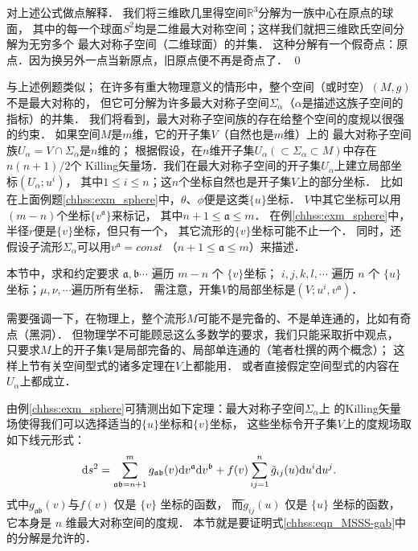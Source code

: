 对上述公式做点解释．
我们将三维欧几里得空间$\mathbb{R}^3$分解为一族中心在原点的球面，
其中的每一个球面$S^2$均是二维最大对称空间；这样我们就把三维欧氏空间分解为无穷多个
最大对称子空间（二维球面）的并集．
这种分解有一个假奇点：原点．因为换另外一点当新原点，旧原点便不再是奇点了．
\qed

与上述例题类似；
在许多有重大物理意义的情形中，整个空间（或时空）$(M,g)$不是最大对称的，
但它可分解为许多最大对称子空间$\Sigma_\alpha$（$\alpha$是描述这族子空间的指标）的并集．
我们将看到，最大对称子空间族的存在给整个空间的度规以很强的约束．
如果空间$M$是$m$维，它的开子集$V$（自然也是$m$维）上的
最大对称子空间族$U_\alpha=V\cap \Sigma_\alpha$是$n$维的；
根据假设，在$n$维开子集$U_\alpha (\subset \Sigma_\alpha \subset M)$中存在$n(n+1)/2$个
Killing矢量场．我们在最大对称子空间的开子集$U_\alpha$上建立局部坐标$(U_\alpha;u^i)$，
其中$1 \leqslant i \leqslant n $；这$n$个坐标自然也是开子集$V$上的部分坐标．
比如在上面例题\ref{chhss:exm_sphere}中，$\theta$、$\phi$便是这类$\{u\}$坐标．
$V$中其它坐标可以用$(m-n)$个坐标$\{v^{\mathfrak{a}}\}$来标记，
其中$n+1 \leqslant \mathfrak{a} \leqslant m$．
在例\ref{chhss:exm_sphere}中，半径$r$便是$\{v\}$坐标，但只有一个，
其它流形的$\{v\}$坐标可能不止一个．
同时，还假设子流形$\Sigma_\alpha$可以用$v^{\mathfrak{a}}=const$
（$n+1 \leqslant \mathfrak{a} \leqslant m$）来描述．

本节中，求和约定要求 $\mathfrak{a},\mathfrak{b} \cdots$ 遍历 $m-n$ 个 $\{v\}$坐标；
$i, j, k, l, \cdots$ 遍历 $n$ 个 $\{u\}$ 坐标；$\mu,\nu,\cdots$遍历所有坐标．
需注意，开集$V$的局部坐标是$(V;u^i, v^{\mathfrak{a}})$．

需要强调一下，在物理上，整个流形$M$可能不是完备的、不是单连通的，比如有奇点（黑洞）．
但物理学不可能顾忌这么多数学的要求，我们只能采取折中观点，
只要求$M$上的开子集$V$是局部完备的、局部单连通的（笔者杜撰的两个概念）；
这样上节有关空间型式的诸多定理在$V$上都能用．
或者直接假定空间型式的内容在$U_\alpha$上都成立．


由例\ref{chhss:exm_sphere}可猜测出如下{\heiti 定理}：最大对称子空间$\Sigma_\alpha$上
的Killing矢量场使得我们可以选择适当的$\{u\}$坐标和$\{v\}$坐标，
这些坐标令开子集$V$上的度规场取如下线元形式：
\begin{equation}\label{chhss:eqn_MSSS-gab}
    \mathrm{d} s^2= \sum_{\mathfrak{ab}=n+1}^{m}
    g_{\mathfrak{ab}}(v) \mathrm{d} v^{\mathfrak{a}} \mathrm{d} v^{\mathfrak{b}}
    +f(v)\sum_{ij=1}^{n} \tilde{g}_{i j}(u) {\rm d}u^i  {\rm d}u^j.
\end{equation}
式中$g_{\mathfrak{ab}}(v)$与$f(v)$ 仅是 $\{v\}$ 坐标的函数，
而$\tilde{g}_{i j}(u)$ 仅是 $\{u\}$ 坐标的函数，
它本身是 $n$ 维最大对称空间的度规．
本节就是要证明式\eqref{chhss:eqn_MSSS-gab}中的分解是允许的．


